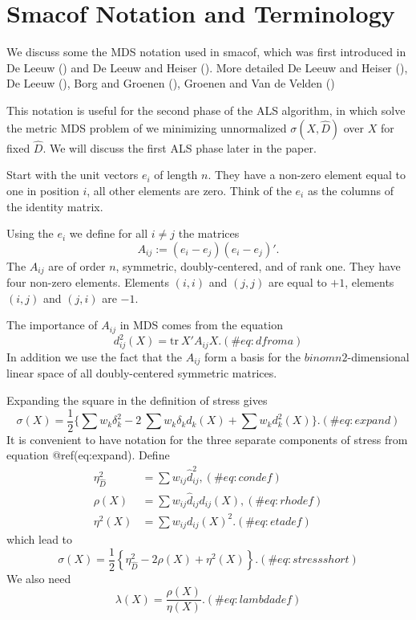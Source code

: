 \documentclass[
  12pt,
  letterpaper,
  DIV=11,
  numbers=noendperiod]{scrartcl}
\newcommand{\sectionbreak}{\clearpage}
\theoremstyle{plain}
\theoremstyle{remark}
\begin{document}
\sectionbreak

\section{Smacof Notation and
Terminology}\label{smacof-notation-and-terminology}

We discuss some the MDS notation used in smacof, which was first
introduced in De Leeuw () and De Leeuw
and Heiser (). More detailed De
Leeuw and Heiser (), De Leeuw
(), Borg and Groenen
(), Groenen and Van de Velden
()

This notation is useful for the second phase of the ALS algorithm, in
which solve the metric MDS problem of we minimizing unnormalized
\(\sigma(X,\hat D)\) over \(X\) for fixed \(\hat D\). We will discuss
the first ALS phase later in the paper.

Start with the unit vectors \(e_i\) of length \(n\). They have a
non-zero element equal to one in position \(i\), all other elements are
zero. Think of the \(e_i\) as the columns of the identity matrix.

Using the \(e_i\) we define for all \(i\not= j\) the matrices
\begin{equation}
A_{ij}:=(e_i-e_j)(e_i-e_j)'.
\end{equation} The \(A_{ij}\) are of order \(n\), symmetric,
doubly-centered, and of rank one. They have four non-zero elements.
Elements \((i,i)\) and \((j,j)\) are equal to \(+1\), elements \((i,j)\)
and \((j,i)\) are \(-1\).

The importance of \(A_{ij}\) in MDS comes from the equation
\begin{equation}
d_{ij}^2(X)=\text{tr}\ X'A_{ij}X.
(\#eq:dfroma)
\end{equation} In addition we use the fact that the \(A_{ij}\) form a
basis for the \(binom{n}{2}\)-dimensional linear space of all
doubly-centered symmetric matrices.

Expanding the square in the definition of stress gives \begin{equation}
\sigma(X)=\frac12\{\sum   w_k\delta_k^2-2\ \sum   w_k\delta_kd_k(X)+\sum   w_kd_k^2(X)\}.
(\#eq:expand)
\end{equation} It is convenient to have notation for the three separate
components of stress from equation @ref(eq:expand). Define \begin{align}
\eta_{\hat D}^2&=\sum   w_{ij}\hat d_{ij}^2,(\#eq:condef)\\
\rho(X)&=\sum   w_{ij}\hat d_{ij}d_{ij}(X),(\#eq:rhodef)\\
\eta^2(X)&=\sum   w_{ij}d_{ij}(X)^2.(\#eq:etadef)
\end{align} which lead to \begin{equation}
\sigma(X)=\frac12\left\{\eta_{\hat D}^2-2\rho(X)+\eta^2(X)\right\}.
(\#eq:stressshort)
\end{equation} We also need \begin{equation}
\lambda(X)=\frac{\rho(X)}{\eta(X)}.
(\#eq:lambdadef)
\end{equation}
\end{document}
